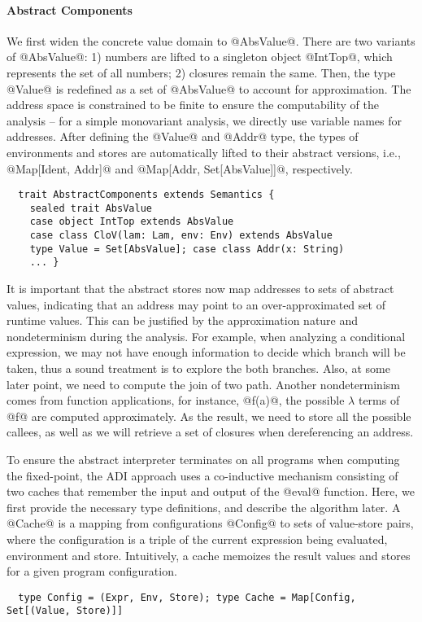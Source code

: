\paragraph{Abstract Components}

We first widen the concrete value domain to @AbsValue@. There are two variants of
@AbsValue@: 1) numbers are lifted to a singleton object @IntTop@, which represents
the set of all numbers; 2) closures remain the same. Then, the type @Value@ is
redefined as a set of @AbsValue@ to account for approximation.  The address
space is constrained to be finite to ensure the computability of the analysis --
for a simple monovariant analysis, we directly use variable names for
addresses. After defining the @Value@ and @Addr@ type, the types of
environments and stores are automatically lifted to their abstract versions,
i.e., @Map[Ident, Addr]@ and @Map[Addr, Set[AbsValue]]@, respectively.  
\begin{lstlisting}
  trait AbstractComponents extends Semantics {
    sealed trait AbsValue
    case object IntTop extends AbsValue
    case class CloV(lam: Lam, env: Env) extends AbsValue
    type Value = Set[AbsValue]; case class Addr(x: String)
    ... }
\end{lstlisting}

It is important that the abstract stores now map addresses to sets of abstract
values, indicating that an address may point to an over-approximated set of
runtime values.  This can be justified by the approximation nature and
nondeterminism during the analysis.  For example, when analyzing a
conditional expression, we may not have enough information to decide which
branch will be taken, thus a sound treatment is to explore the both branches.
Also, at some later point, we need to compute the join of two path.  Another
nondeterminism comes from function applications, for instance, @f(a)@, the
possible $\lambda$ terms of @f@ are computed approximately.  As the
result, we need to store all the possible callees, as well as we will
retrieve a set of closures when dereferencing an address. 

To ensure the abstract interpreter terminates on all programs when computing
the fixed-point, the ADI approach uses a co-inductive mechanism consisting of
two caches that remember the input and output of the @eval@ function.
Here, we first provide the necessary type definitions, and describe
the algorithm later. A @Cache@ is a mapping from configurations @Config@ to
sets of value-store pairs, where the configuration is a triple of the current
expression being evaluated, environment and store. Intuitively, a cache memoizes
the result values and stores for a given program configuration.
\begin{lstlisting}
  type Config = (Expr, Env, Store); type Cache = Map[Config, Set[(Value, Store)]]
\end{lstlisting}

